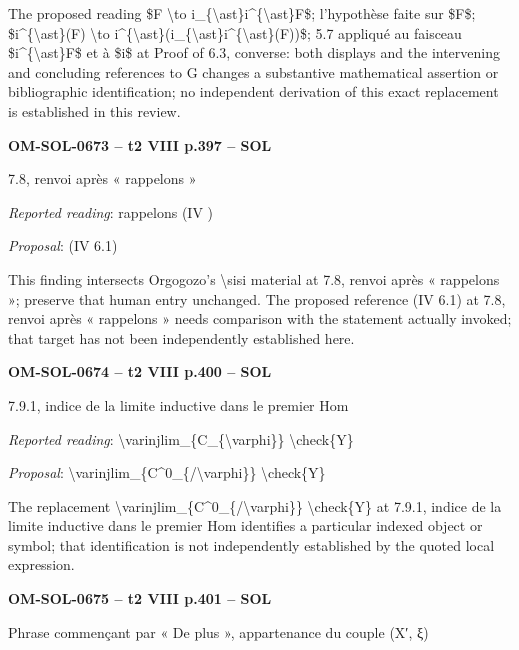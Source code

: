 The proposed reading \$F \textbackslash{}to i\_\{\textbackslash{}ast\}i\textasciicircum{}\{\textbackslash{}ast\}F\$; l'hypothèse faite sur \$F\$; \$i\textasciicircum{}\{\textbackslash{}ast\}(F) \textbackslash{}to i\textasciicircum{}\{\textbackslash{}ast\}(i\_\{\textbackslash{}ast\}i\textasciicircum{}\{\textbackslash{}ast\}(F))\$; 5.7 appliqué au faisceau \$i\textasciicircum{}\{\textbackslash{}ast\}F\$ et à \$i\$ at Proof of 6.3, converse: both displays and the intervening and concluding references to G changes a substantive mathematical assertion or bibliographic identification; no independent derivation of this exact replacement is established in this review.\par
\par\noindent\textbf{OM-SOL-0673 -- t2 VIII p.397 -- SOL}\par
7.8, renvoi après « rappelons »\par
\emph{Reported reading}: rappelons (IV )\par
\emph{Proposal}: (IV 6.1)\par
This finding intersects Orgogozo's \textbackslash{}sisi material at 7.8, renvoi après « rappelons »; preserve that human entry unchanged. The proposed reference (IV 6.1) at 7.8, renvoi après « rappelons » needs comparison with the statement actually invoked; that target has not been independently established here.\par
\par\noindent\textbf{OM-SOL-0674 -- t2 VIII p.400 -- SOL}\par
7.9.1, indice de la limite inductive dans le premier Hom\par
\emph{Reported reading}: \textbackslash{}varinjlim\_\{C\_\{\textbackslash{}varphi\}\} \textbackslash{}check\{Y\}\par
\emph{Proposal}: \textbackslash{}varinjlim\_\{C\textasciicircum{}0\_\{/\textbackslash{}varphi\}\} \textbackslash{}check\{Y\}\par
The replacement \textbackslash{}varinjlim\_\{C\textasciicircum{}0\_\{/\textbackslash{}varphi\}\} \textbackslash{}check\{Y\} at 7.9.1, indice de la limite inductive dans le premier Hom identifies a particular indexed object or symbol; that identification is not independently established by the quoted local expression.\par
\par\noindent\textbf{OM-SOL-0675 -- t2 VIII p.401 -- SOL}\par
Phrase commençant par « De plus », appartenance du couple (X′, ξ)\par

